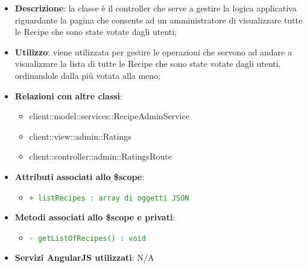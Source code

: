 			\begin{itemize}
				\item \textbf{Descrizione}: la classe è il controller che serve a gestire la logica applicativa riguardante la pagina che consente ad un amministratore di visualizzare tutte le Recipe che sono state votate dagli utenti;
				\item \textbf{Utilizzo}: viene utilizzata per gestire le operazioni che servono ad andare a visualizzare la lista di tutte le Recipe che sono state votate dagli utenti, ordinandole dalla più votata alla meno;
				\item \textbf{Relazioni con altre classi}:
					\begin{itemize}
						\item client::model::services::RecipeAdminService
						\item client::view::admin::Ratings
						\item client::controller::admin::RatingsRoute
					\end{itemize}

				\item \textbf{Attributi associati allo \$scope}:
					\begin{itemize}
						\item \textcolor{forestgreen}{\texttt{+ listRecipes : array di oggetti JSON}}

					\end{itemize}

				\item \textbf{Metodi associati allo \$scope e privati}:
					\begin{itemize}
						\item \textcolor{forestgreen}{\texttt{- getListOfRecipes() : void}}

					\end{itemize}

				\item \textbf{Servizi AngularJS utilizzati}: N/A

			\end{itemize}

